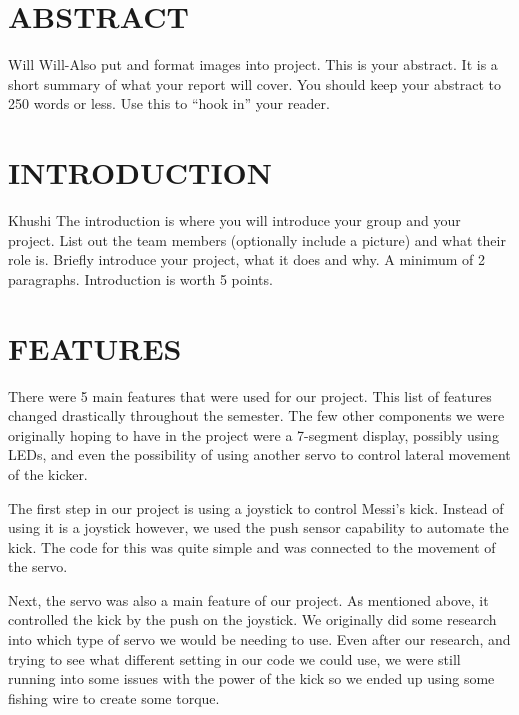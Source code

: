 \documentclass[12pt]{article}
\begin{document}
\tableofcontents
\pagebreak

\section{ABSTRACT}
Will
Will-Also put and format images into project.
This is your abstract.  It is a short summary of what your report will cover.  You should keep your abstract to 250 words or less.  Use this to ``hook in'' your reader.

\section{INTRODUCTION}
Khushi
The introduction is where you will introduce your group and your project. List out the team members (optionally include a picture) and what their role is. Briefly introduce your project, what it does and why. A minimum of 2 paragraphs. Introduction is worth 5 points.

\section{FEATURES}
There were 5 main features that were used for our project. This list of features changed drastically throughout the semester. The few other components we were originally hoping to have in the project were a 7-segment display, possibly using LEDs, and even the possibility of using another servo to control lateral movement of the kicker. 

The first step in our project is using a joystick to control Messi's kick. Instead of using it is a joystick however, we used the push sensor capability to automate the kick. The code for this was quite simple and was connected to the movement of the servo. 

Next, the servo was also a main feature of our project. As mentioned above, it controlled the kick by the push on the joystick. We originally did some research into which type of servo we would be needing to use. Even after our research, and trying to see what different setting in our code we could use, we were still running into some issues with the power of the kick so we ended up using some fishing wire to create some torque. 
\end{document}
